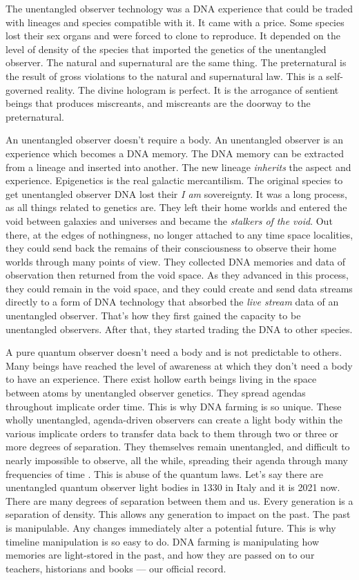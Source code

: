 \documentclass[letterpaper,11pt,twoside,titlepage,onecolumn,openany]{book}
\begin{document}
The unentangled observer technology was a DNA experience that could be
traded with lineages and species compatible with it. It came with a
price. Some species lost their sex organs and were forced to clone to
reproduce. It depended on the level of density of the species that
imported the genetics of the unentangled observer. The natural and
supernatural are the same thing. The preternatural is the result of
gross violations to the natural and supernatural law. This is a
self-governed reality. The divine hologram is perfect. It is the
arrogance of sentient beings that produces miscreants, and miscreants
are the doorway to the preternatural.

An unentangled observer doesn't require a body. An unentangled observer
is an experience which becomes a DNA memory. The DNA memory can be
extracted from a lineage and inserted into another. The new lineage
\emph{inherits} the aspect and experience. Epigenetics is the real
galactic mercantilism. The original species to get unentangled observer
DNA lost their \emph{I am} sovereignty. It was a long process, as all
things related to genetics are. They left their home worlds and entered
the void between galaxies and universes and became the \emph{stalkers of
the void}. Out there, at the edges of nothingness, no longer attached to
any time space localities, they could send back the remains of their
consciousness to observe their home worlds through many points of view.
They collected DNA memories and data of observation then returned from
the void space. As they advanced in this process, they could remain in
the void space, and they could create and send data streams directly to
a form of DNA technology that absorbed the \emph{live stream} data of an
unentangled observer. That's how they first gained the capacity to be
unentangled observers. After that, they started trading the DNA to other
species.

A pure quantum observer doesn't need a body and is not predictable to
others. Many beings have reached the level of awareness at which they
don't need a body to have an experience. There exist hollow earth beings
living in the space between atoms by unentangled observer genetics. They
spread agendas throughout implicate order time. This is why DNA farming
is so unique. These wholly unentangled, agenda-driven observers can
create a light body within the various implicate orders to transfer data
back to them through two or three or more degrees of separation. They
themselves remain unentangled, and difficult to nearly impossible to
observe, all the while, spreading their agenda through many frequencies
of time . This is abuse of the quantum laws. Let's say there are
unentangled quantum observer light bodies in 1330 in Italy and it is
2021 now. There are many degrees of separation between them and us.
Every generation is a separation of density. This allows any generation
to impact on the past. The past is manipulable. Any changes immediately
alter a potential future. This is why timeline manipulation is so easy
to do. DNA farming is manipulating how memories are light-stored in the
past, and how they are passed on to our teachers, historians and books
--- our official record.
\end{document}
